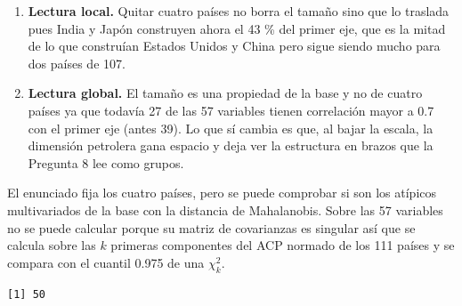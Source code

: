 \documentclass[oneside, openany, fontset=libertinus]{mitthesis}
\newenvironment{Shaded}{\begin{snugshade}}{\end{snugshade}}
\newcommand{\AttributeTok}[1]{\textcolor[rgb]{0.40,0.45,0.13}{#1}}
\newcommand{\FunctionTok}[1]{\textcolor[rgb]{0.28,0.35,0.67}{#1}}
\newcommand{\NormalTok}[1]{\textcolor[rgb]{0.00,0.23,0.31}{#1}}
\newcommand{\OtherTok}[1]{\textcolor[rgb]{0.00,0.23,0.31}{#1}}
\newcommand{\SpecialCharTok}[1]{\textcolor[rgb]{0.37,0.37,0.37}{#1}}
\newcommand{\StringTok}[1]{\textcolor[rgb]{0.13,0.47,0.30}{#1}}
\providecommand{\tightlist}{\setlength{\itemsep}{0pt}\setlength{\parskip}{0pt}}
\begin{document}
\begin{enumerate}
\def\labelenumi{\alph{enumi}.}
\tightlist
\item
  \textbf{Lectura local.} Quitar cuatro países no borra el tamaño sino
  que lo traslada pues India y Japón construyen ahora el 43 \% del
  primer eje, que es la mitad de lo que construían Estados Unidos y
  China pero sigue siendo mucho para dos países de 107.
\item
  \textbf{Lectura global.} El tamaño es una propiedad de la base y no de
  cuatro países ya que todavía 27 de las 57 variables tienen correlación
  mayor a 0.7 con el primer eje (antes 39). Lo que sí cambia es que, al
  bajar la escala, la dimensión petrolera gana espacio y deja ver la
  estructura en brazos que la Pregunta 8 lee como grupos.
\end{enumerate}

El enunciado fija los cuatro países, pero se puede comprobar si son los
atípicos multivariados de la base con la distancia de Mahalanobis. Sobre
las 57 variables no se puede calcular porque su matriz de covarianzas es
singular así que se calcula sobre las \(k\) primeras componentes del ACP
normado de los 111 países y se compara con el cuantil 0.975 de una
\(\chi^2_k\).

\Needspace{0.57in}

\begin{Shaded}
\end{Shaded}

\begin{verbatim}
[1] 50
\end{verbatim}

\Needspace{4.37in}
\end{document}
